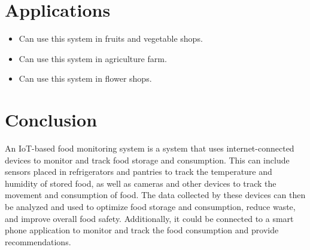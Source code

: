 \documentclass{report}
\begin{document}
\begin{multicols}{1}
    \section*{Applications}
    \begin{itemize}
        \item Can use this system in fruits and vegetable shops.
        \item Can use this system in agriculture farm.
        \item Can use this system in flower shops.
    \end{itemize}
     
    \section*{Conclusion}
   An IoT-based food monitoring system is a system that uses internet-connected devices to monitor and track food storage and consumption. This can include sensors placed in refrigerators and pantries to track the temperature and humidity of stored food, as well as cameras and other devices to track the movement and consumption of food. The data collected by these devices can then be analyzed and used to optimize food storage and consumption, reduce waste, and improve overall food safety. Additionally, it could be connected to a smart phone application to monitor and track the food consumption and provide recommendations.

  
    
\end{multicols}
\end{document}

